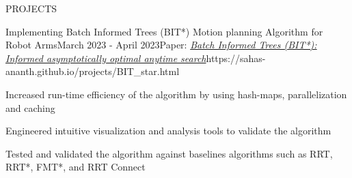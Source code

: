 \documentclass{resume} %
\begin{document}
\begin{rSection}{PROJECTS}
	\begin{rProjExpDetails}{Implementing Batch Informed Trees (BIT*) Motion planning Algorithm for Robot Arms}{}{March 2023 - April 2023}{Paper: \href{https://journals.sagepub.com/doi/pdf/10.1177/0278364919890396}{\textit{Batch Informed Trees (BIT*): Informed asymptotically optimal anytime search}}}{https://sahas-ananth.github.io/projects/BIT_star.html}{}
		\item Increased run-time efficiency of the algorithm by using hash-maps, parallelization and caching
		\item Engineered intuitive visualization and analysis tools to validate the algorithm
		\item Tested and validated the algorithm against baselines algorithms such as RRT, RRT*, FMT*, and RRT Connect
	\end{rProjExpDetails}


\end{rSection}
\end{document}
